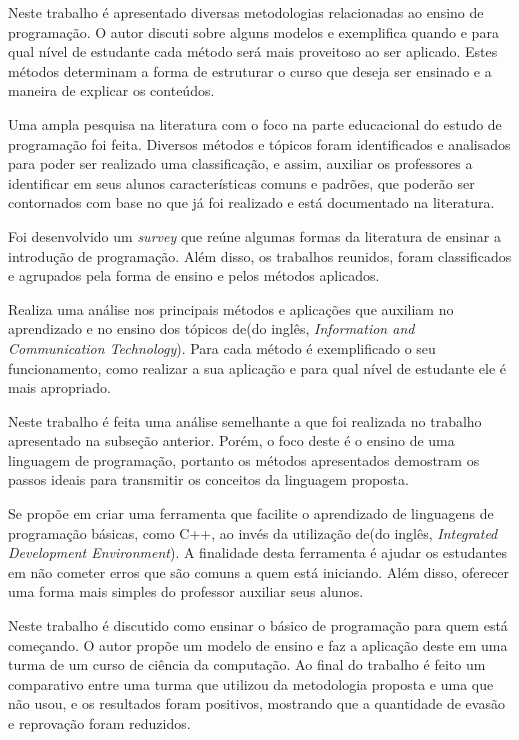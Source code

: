 \cite{methods}
Neste trabalho é apresentado diversas metodologias relacionadas ao ensino de programação. O autor discuti sobre alguns modelos e exemplifica quando e para qual nível de estudante cada método será mais proveitoso ao ser aplicado. Estes métodos determinam a forma de estruturar o curso que deseja ser ensinado e a maneira de explicar os conteúdos.

\cite{doi:10.1076/csed.13.2.137.14200} Uma ampla pesquisa na literatura com o foco na parte educacional do estudo de programação foi feita. Diversos métodos e tópicos foram identificados e analisados para poder ser realizado uma classificação, e assim, auxiliar os professores a identificar em seus alunos características comuns e padrões, que poderão ser contornados com base no que já foi realizado e está documentado na literatura.

\cite{Pears:2007:SLT:1345443.1345441}
Foi desenvolvido um \textit{survey} que reúne algumas formas da literatura de ensinar a introdução de programação. Além disso, os trabalhos reunidos, foram classificados e agrupados pela forma de ensino e pelos métodos aplicados.



\cite{teachingapplications} Realiza uma análise nos principais métodos e aplicações que auxiliam no aprendizado e no ensino dos tópicos de(do inglês, \textit{Information and Communication Technology}). Para cada método é exemplificado o seu funcionamento, como realizar a sua aplicação e para qual nível de estudante ele é mais apropriado. 


\cite{teachingapplicationslanguages} Neste trabalho é feita uma análise semelhante a que foi realizada no trabalho apresentado na subseção anterior. Porém, o foco deste é o ensino de uma linguagem de programação, portanto os métodos apresentados demostram os passos ideais para transmitir os conceitos da linguagem proposta.

\cite{newapproach} Se propõe em criar uma ferramenta que facilite o aprendizado de linguagens de programação básicas, como C++, ao invés da utilização de(do inglês, \textit{Integrated Development Environment}). A finalidade desta ferramenta é ajudar os estudantes em não cometer erros que são comuns a quem está iniciando. Além disso, oferecer uma forma mais simples do professor auxiliar seus alunos.

\cite{Vihavainen:2011:EAM:1953163.1953196}
Neste trabalho é discutido como ensinar o básico de programação para quem está começando. O autor propõe um modelo de ensino e faz a aplicação deste em uma turma de um curso de ciência da computação. Ao final do trabalho é feito um comparativo entre uma turma que utilizou da metodologia proposta e uma que não usou, e os resultados foram positivos, mostrando que a quantidade de evasão e reprovação foram reduzidos.

